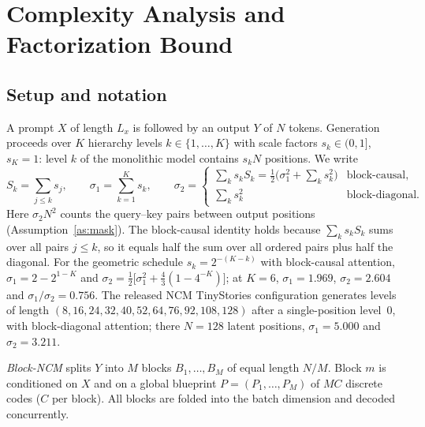 
\section{Complexity Analysis and Factorization Bound}
\label{sec:complexity}

\subsection{Setup and notation}
\label{sec:notation}

A prompt $X$ of length $L_x$ is followed by an output $Y$ of $N$ tokens.
Generation proceeds over $K$ hierarchy levels $k\in\{1,\dots,K\}$ with scale
factors $s_k\in(0,1]$, $s_K=1$: level $k$ of the monolithic model contains
$s_kN$ positions. We write
\begin{equation}
  S_k=\sum_{j\le k}s_j,\qquad
  \sigma_1=\sum_{k=1}^{K}s_k,\qquad
  \sigma_2=\begin{cases}
    \sum_{k}s_kS_k=\tfrac12\big(\sigma_1^2+\sum_{k}s_k^2\big) & \text{block-causal},\\[2pt]
    \sum_{k}s_k^2 & \text{block-diagonal}.
  \end{cases}
  \label{eq:sigmas}
\end{equation}
Here $\sigma_2N^2$ counts the query--key pairs between output positions
(Assumption~\ref{as:mask}). The block-causal identity holds because
$\sum_k s_kS_k$ sums over all pairs $j\le k$, so it equals half the sum over
all ordered pairs plus half the diagonal.
For the geometric schedule $s_k=2^{-(K-k)}$ with block-causal attention,
$\sigma_1=2-2^{1-K}$ and $\sigma_2=\tfrac12\big[\sigma_1^2+\tfrac43(1-4^{-K})\big]$; at
$K=6$, $\sigma_1=1.969$, $\sigma_2=2.604$ and $\sigma_1/\sigma_2=0.756$.
The released NCM TinyStories configuration generates levels of length
$(8,16,24,32,40,52,64,76,92,108,128)$ after a single-position level~0, with
block-diagonal attention; there $N=128$ latent positions, $\sigma_1=5.000$ and
$\sigma_2=3.211$.

\emph{Block-NCM} splits $Y$ into $M$ blocks $B_1,\dots,B_M$ of equal length
$N/M$. Block $m$ is conditioned on $X$ and on a global blueprint
$P=(P_1,\dots,P_M)$ of $MC$ discrete codes ($C$ per block). All blocks are
folded into the batch dimension and decoded concurrently.

